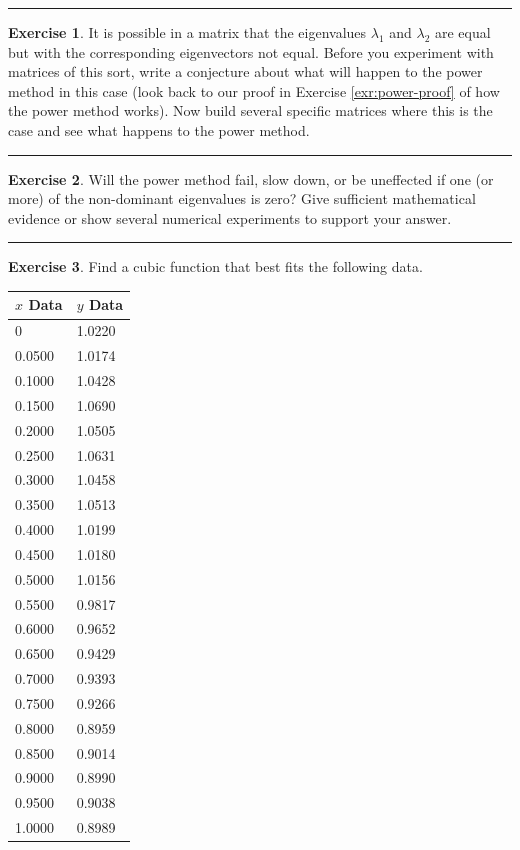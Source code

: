 \documentclass[
]{book}
\theoremstyle{definition}
\theoremstyle{definition}
\theoremstyle{definition}
\newtheorem{exercise}{Exercise}[chapter]
\theoremstyle{remark}
\begin{document}
\begin{center}\rule{0.5\linewidth}{0.5pt}\end{center}

\begin{exercise}
\protect\hypertarget{exr:unnamed-chunk-394}{}{\label{exr:unnamed-chunk-394} }It is possible in a matrix that the eigenvalues \(\lambda_1\) and \(\lambda_2\) are equal but with the corresponding eigenvectors not equal. Before you experiment with matrices of this sort, write a conjecture about what will happen to the power method in this case (look back to our proof in Exercise \ref{exr:power-proof} of how the power method works). Now build several specific matrices where this is the case and see what happens to the power method.
\end{exercise}

\begin{center}\rule{0.5\linewidth}{0.5pt}\end{center}

\begin{exercise}
\protect\hypertarget{exr:unnamed-chunk-395}{}{\label{exr:unnamed-chunk-395} }Will the power method fail, slow down, or be uneffected if one (or more) of the non-dominant eigenvalues is zero? Give sufficient mathematical evidence or show several numerical experiments to support your answer.
\end{exercise}

\begin{center}\rule{0.5\linewidth}{0.5pt}\end{center}

\begin{exercise}
\protect\hypertarget{exr:unnamed-chunk-396}{}{\label{exr:unnamed-chunk-396} }Find a cubic function that best fits the following data.
\end{exercise}

\begin{longtable}[]{@{}ll@{}}
\toprule
\(x\) Data & \(y\) Data\tabularnewline
\midrule
\endhead
0 & 1.0220\tabularnewline
0.0500 & 1.0174\tabularnewline
0.1000 & 1.0428\tabularnewline
0.1500 & 1.0690\tabularnewline
0.2000 & 1.0505\tabularnewline
0.2500 & 1.0631\tabularnewline
0.3000 & 1.0458\tabularnewline
0.3500 & 1.0513\tabularnewline
0.4000 & 1.0199\tabularnewline
0.4500 & 1.0180\tabularnewline
0.5000 & 1.0156\tabularnewline
0.5500 & 0.9817\tabularnewline
0.6000 & 0.9652\tabularnewline
0.6500 & 0.9429\tabularnewline
0.7000 & 0.9393\tabularnewline
0.7500 & 0.9266\tabularnewline
0.8000 & 0.8959\tabularnewline
0.8500 & 0.9014\tabularnewline
0.9000 & 0.8990\tabularnewline
0.9500 & 0.9038\tabularnewline
1.0000 & 0.8989\tabularnewline
\bottomrule
\end{longtable}
\end{document}
